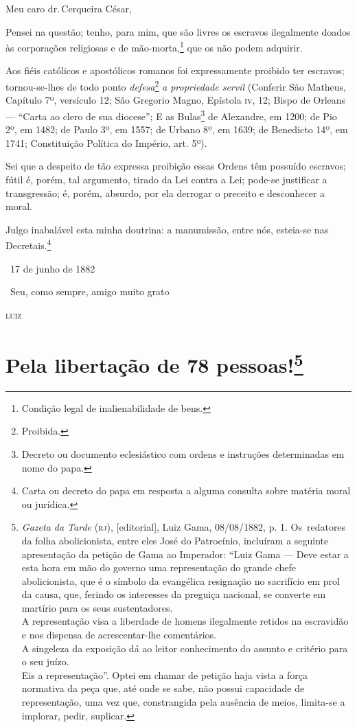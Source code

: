 Meu caro dr.\,Cerqueira César,

Pensei na questão; tenho, para mim, que são livres os escravos
ilegalmente doados às corporações religiosas e de mão-morta,\footnote{
  Condição legal de inalienabilidade de bens.} que os não podem
adquirir.

Aos fiéis católicos e apostólicos romanos foi expressamente proibido ter
escravos; tornou-se-lhes de todo ponto \emph{defesa}\footnote{
  Proibida.} \emph{a propriedade servil} (Conferir São
Matheus, Capítulo 7º, versículo 12; São Gregorio
Magno, Epístola \textsc{iv}, 12; Bispo de Orleans --- ``Carta ao
clero de sua diocese''; E as Bulas\footnote{Decreto ou documento
  eclesiástico com ordens e instruções determinadas em nome do papa.}
de Alexandre, em 1200; de Pio 2º, em 1482; de Paulo
3º, em 1557; de Urbano 8º, em 1639; de Benedicto 14º, em 1741;
Constituição Política do Império, art. 5º).

Sei que a despeito de tão expressa proibição essas Ordens têm possuído
escravos; fútil é, porém, tal argumento, tirado da Lei contra a Lei;
pode-se justificar a transgressão; é, porém, absurdo, por ela derrogar o
preceito e desconhecer a moral.

Julgo inabalável esta minha doutrina: a manumissão, entre nós, esteia-se
nas Decretais.\footnote{Carta ou decreto do papa em resposta a alguma
  consulta sobre matéria moral ou jurídica.}

\hfill\ 17 de junho de 1882

\hfill\ Seu, como sempre, amigo muito grato

\hfill\textsc{luiz}

\chapter{Pela libertação de 78 pessoas!\footnote{
\emph{Gazeta da Tarde} (\textsc{rj}), {[}editorial{]}, Luiz Gama, 08/08/1882,
  p. 1. Os~redatores da folha abolicionista, entre eles José do
  Patrocínio, incluíram a seguinte apresentação da petição de Gama ao
  Imperador: ``Luiz Gama --- Deve estar a esta hora em mão do
  governo uma representação do grande chefe abolicionista, que é o
  símbolo da evangélica resignação no sacrifício em prol da causa, que,
  ferindo os interesses da preguiça nacional, se converte em martírio
  para os seus sustentadores.\\
  A representação visa a liberdade de homens ilegalmente retidos na
  escravidão e nos dispensa de acrescentar-lhe comentários.\\
  A singeleza da exposição dá ao leitor conhecimento do assunto e
  critério para o seu juízo.\\
  Eis a representação''. Optei em chamar de petição haja vista a força
  normativa da peça que, até onde se sabe, não possui capacidade de
  representação, uma vez que, constrangida pela ausência de meios,
  limita-se a implorar, pedir, suplicar.}}

